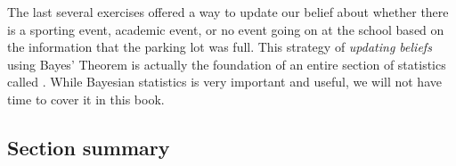 The last several exercises offered a way to update our belief about whether there is a sporting event, academic event, or no event going on at the school based on the information that the parking lot was full. This strategy of \emph{updating beliefs} using Bayes' Theorem is actually the foundation of an entire section of statistics called . While Bayesian statistics is very important and useful, we will not have time to cover it in this book.



\D{\newpage}

\subsection*{Section summary}

